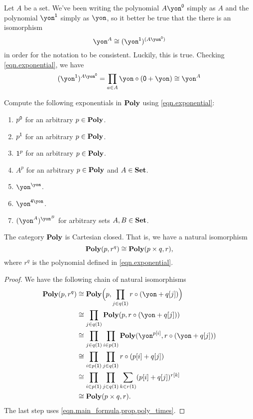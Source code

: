 \documentclass[Book-Poly]{subfiles}
\begin{document}
\begin{example}
Let $A$ be a set. We've been writing the polynomial $A\yon^\0$ simply as $A$ and the polynomial $\yon^\1$ simply as $\yon$, so it better be true that the there is an isomorphism 
\[\yon^A\cong (\yon^\1)^{(A\yon^\0)}\]
in order for the notation to be consistent. Luckily, this is true. Checking \eqref{eqn.exponential}, we have
\[(\yon^\1)^{A\yon^\0}=\prod_{a\in A}\yon\circ(\0+\yon)\cong\yon^A\]
\end{example}

\begin{exercise}
Compute the following exponentials in $\textbf{Poly}$ using \eqref{eqn.exponential}:
\begin{enumerate}
	\item $p^{\textsf{0}}$ for an arbitrary $p\in\textbf{Poly}$.
	\item $p^{\textsf{1}}$ for an arbitrary $p\in\textbf{Poly}$.
	\item $\textsf{1}^p$ for an arbitrary $p\in\textbf{Poly}$.
	\item $A^p$ for an arbitrary $p\in\textbf{Poly}$ and $A\in\textbf{Set}$.
	\item $\yon^\yon$.
	\item $\yon^{\4\yon}$.
	\item $(\yon^A)^{\yon^B}$ for arbitrary sets $A,B\in\textbf{Set}$.
\qedhere
\end{enumerate}
\end{exercise}


\begin{theorem}\label{thm.poly_cart_closed}
The category $\textbf{Poly}$ is Cartesian closed. That is, we have a natural isomorphism
\[
  \textbf{Poly}(p,r^q)\cong\textbf{Poly}(p\times q,r),
\]
where $r^q$ is the polynomial defined in \eqref{eqn.exponential}.
\end{theorem}
\begin{proof}
We have the following chain of natural isomorphisms
\begin{align*}
	\poly(p,r^q)&\cong
	\poly\Big(p,\prod_{j\in q(\1)}r\circ (\yon+q[j])\Big)\\&\cong
	\prod_{j\in q(\1)}\poly(p,r\circ(\yon+q[j]))\\&\cong
	\prod_{j\in q(\1)}\prod_{i\in p(\1)}\poly(\yon^{p[i]},r\circ(\yon+q[j]))\\&\cong
	\prod_{i\in p(\1)}\prod_{j\in q(\1)}r\circ(p[i]+q[j])\\&\cong
	\prod_{i\in p(\1)}\prod_{j\in q(\1)}\sum_{k\in r(\1)}(p[i]+q[j])^{r[k]}\\&\cong
	\poly(p\times q,r).
\end{align*}
The last step uses \cref{eqn.main_formula,prop.poly_times}.
\end{proof}
\end{document}
